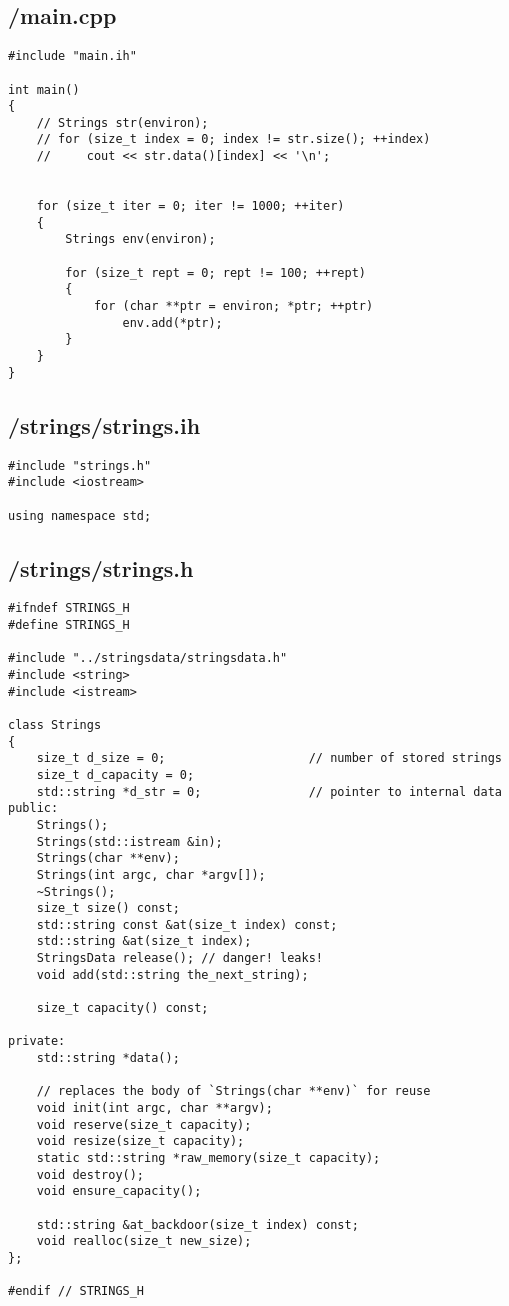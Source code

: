 \documentclass{article}
\begin{document}
\subsection*{/main.cpp}
\begin{verbatim}
#include "main.ih"

int main()
{
    // Strings str(environ);
    // for (size_t index = 0; index != str.size(); ++index)
    //     cout << str.data()[index] << '\n';
    

    for (size_t iter = 0; iter != 1000; ++iter)
    {
        Strings env(environ);

        for (size_t rept = 0; rept != 100; ++rept)
        {
            for (char **ptr = environ; *ptr; ++ptr)
                env.add(*ptr);
        }
    } 
}
\end{verbatim}
\subsection*{/strings/strings.ih}
\begin{verbatim}
#include "strings.h"
#include <iostream>

using namespace std;

\end{verbatim}
\subsection*{/strings/strings.h}
\begin{verbatim}
#ifndef STRINGS_H
#define STRINGS_H

#include "../stringsdata/stringsdata.h"
#include <string>
#include <istream>

class Strings 
{
    size_t d_size = 0;                    // number of stored strings
    size_t d_capacity = 0;
    std::string *d_str = 0;               // pointer to internal data
public:
    Strings();
    Strings(std::istream &in);
    Strings(char **env);
    Strings(int argc, char *argv[]);
    ~Strings();
    size_t size() const;
    std::string const &at(size_t index) const;
    std::string &at(size_t index);
    StringsData release(); // danger! leaks!
    void add(std::string the_next_string);

    size_t capacity() const;

private:
    std::string *data();

    // replaces the body of `Strings(char **env)` for reuse
    void init(int argc, char **argv);
    void reserve(size_t capacity);
    void resize(size_t capacity);
    static std::string *raw_memory(size_t capacity);
    void destroy();
    void ensure_capacity();

    std::string &at_backdoor(size_t index) const;
    void realloc(size_t new_size);
};

#endif // STRINGS_H

\end{verbatim}
\end{document}
